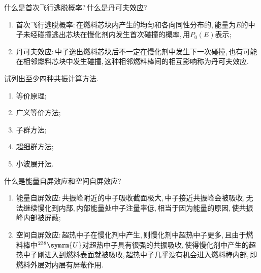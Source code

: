 \begin{exercise}
    什么是首次飞行逃脱概率?\,什么是丹可夫效应?\,
    \begin{solution}
        \begin{enumerate}[(1)]
            \item 首次飞行逃脱概率:\,在燃料芯块内产生的均匀和各向同性分布的,\,能量为$E$的中子未经碰撞逃出芯块在慢化剂内发生首次碰撞的概率,\,用$P_0(E)$表示;\,
            \item 丹可夫效应:\,中子逸出燃料芯块后不一定在慢化剂中发生下一次碰撞,\,也有可能在相邻燃料芯块中发生碰撞,\,这种相邻燃料棒间的相互影响称为丹可夫效应.\,
        \end{enumerate}
    \end{solution}
\end{exercise}

\begin{exercise}
    试列出至少四种共振计算方法.\,
    \begin{solution}
        \begin{enumerate}[(1)]
            \item 等价原理;
            \item 广义等价方法;
            \item 子群方法;
            \item 超细群方法;
            \item 小波展开法.
        \end{enumerate}
    \end{solution}
\end{exercise}

\begin{exercise}
    什么是能量自屏效应和空间自屏效应?\,
    \begin{solution}
        \begin{enumerate}[(1)]
            \item 能量自屏效应:\,共振峰附近的中子吸收截面极大,\,中子接近共振峰会被吸收,\,无法继续慢化到内部,\,内部能量处中子注量率低,\,相当于因为能量的原因,\,使共振峰内部被屏蔽;\,
            \item 空间自屏效应:\,超热中子在慢化剂中产生,\,则慢化剂中超热中子更多,\,且由于燃料棒中${}^{238}\symrm{U}$对超热中子具有很强的共振吸收,\,使得慢化剂中产生的超热中子刚进入到燃料表面就被吸收,\,超热中子几乎没有机会进入燃料棒内部,\,即燃料外层对内层有屏蔽作用.\,
        \end{enumerate}
    \end{solution}
\end{exercise}

